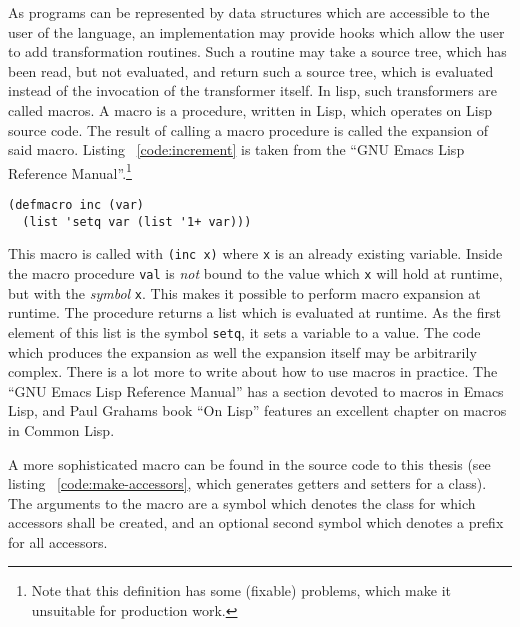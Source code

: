 \documentclass[a4paper,10pt,twoside]{report}
\newcommand{\el}{Emacs Lisp}
\newcommand{\cl}{Common Lisp}
\newcommand{\sym}[1]{\texttt{#1}}
\begin{document}
As programs can be represented by data structures which are accessible to the
user of the language, an implementation may provide hooks which allow the user
to add transformation routines.  Such a routine may take a source tree, which
has been read, but not evaluated, and return such a source tree, which is
evaluated instead of the invocation of the transformer itself.  In lisp, such
transformers are called macros.  A macro is a procedure, written in Lisp, which
operates on Lisp source code.  The result of calling a macro procedure is called
the expansion of said macro.  Listing ~\ref{code:increment} is taken from the
``GNU Emacs Lisp Reference Manual''.\footnote{Note that this definition has some
  (fixable) problems, which make it unsuitable for production work.}

\begin{lstlisting}[style=lispcode,caption={Increment as a
      macro.},label={code:increment}]
(defmacro inc (var)
  (list 'setq var (list '1+ var)))
\end{lstlisting}

This macro is called with \texttt{(inc x)} where \sym{x} is an already existing
variable.  Inside the macro procedure \sym{val} is \emph{not} bound to the value
which \sym{x} will hold at runtime, but with the \emph{symbol} \sym{x}.  This
makes it possible to perform macro expansion at runtime.  The procedure returns
a list which is evaluated at runtime.  As the first element of this list is the
symbol \sym{setq}, it sets a variable to a value.  The code which produces the
expansion as well the expansion itself may be arbitrarily complex.  There is a
lot more to write about how to use macros in practice.  The ``GNU Emacs Lisp
Reference Manual'' has a section devoted to macros in \el, and Paul Grahams book
``On Lisp'' \cite{on-lisp} features an excellent chapter on macros in \cl{}.

A more sophisticated macro can be found in the source code to this thesis (see
listing ~\ref{code:make-accessors}, which generates getters and setters for a
class).  The arguments to the macro are a symbol which denotes the class for
which accessors shall be created, and an optional second symbol which denotes a
prefix for all accessors.
\end{document}

